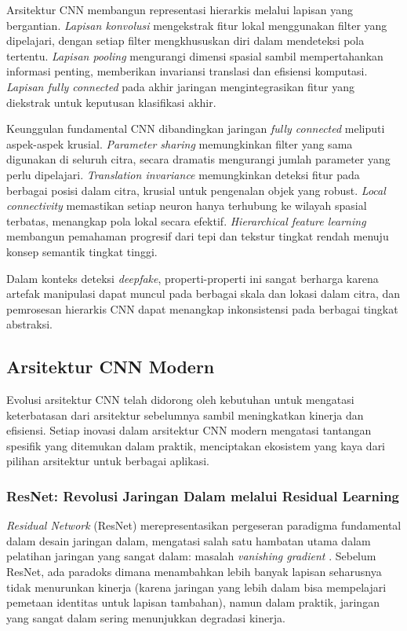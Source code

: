 Arsitektur CNN membangun representasi hierarkis melalui lapisan yang bergantian. \textit{Lapisan konvolusi} mengekstrak fitur lokal menggunakan filter yang dipelajari, dengan setiap filter mengkhususkan diri dalam mendeteksi pola tertentu. \textit{Lapisan pooling} mengurangi dimensi spasial sambil mempertahankan informasi penting, memberikan invariansi translasi dan efisiensi komputasi. \textit{Lapisan fully connected} pada akhir jaringan mengintegrasikan fitur yang diekstrak untuk keputusan klasifikasi akhir.

Keunggulan fundamental CNN dibandingkan jaringan \textit{fully connected} meliputi aspek-aspek krusial. \textit{Parameter sharing} memungkinkan filter yang sama digunakan di seluruh citra, secara dramatis mengurangi jumlah parameter yang perlu dipelajari. \textit{Translation invariance} memungkinkan deteksi fitur pada berbagai posisi dalam citra, krusial untuk pengenalan objek yang robust. \textit{Local connectivity} memastikan setiap neuron hanya terhubung ke wilayah spasial terbatas, menangkap pola lokal secara efektif. \textit{Hierarchical feature learning} membangun pemahaman progresif dari tepi dan tekstur tingkat rendah menuju konsep semantik tingkat tinggi.

Dalam konteks deteksi \textit{deepfake}, properti-properti ini sangat berharga karena artefak manipulasi dapat muncul pada berbagai skala dan lokasi dalam citra, dan pemrosesan hierarkis CNN dapat menangkap inkonsistensi pada berbagai tingkat abstraksi.

\subsection{Arsitektur CNN Modern}

Evolusi arsitektur CNN telah didorong oleh kebutuhan untuk mengatasi keterbatasan dari arsitektur sebelumnya sambil meningkatkan kinerja dan efisiensi. Setiap inovasi dalam arsitektur CNN modern mengatasi tantangan spesifik yang ditemukan dalam praktik, menciptakan ekosistem yang kaya dari pilihan arsitektur untuk berbagai aplikasi.

\subsubsection{ResNet: Revolusi Jaringan Dalam melalui Residual Learning}

\textit{Residual Network} (ResNet) merepresentasikan pergeseran paradigma fundamental dalam desain jaringan dalam, mengatasi salah satu hambatan utama dalam pelatihan jaringan yang sangat dalam: masalah \textit{vanishing gradient} \cite{he2016deep}. Sebelum ResNet, ada paradoks dimana menambahkan lebih banyak lapisan seharusnya tidak menurunkan kinerja (karena jaringan yang lebih dalam bisa mempelajari pemetaan identitas untuk lapisan tambahan), namun dalam praktik, jaringan yang sangat dalam sering menunjukkan degradasi kinerja.

